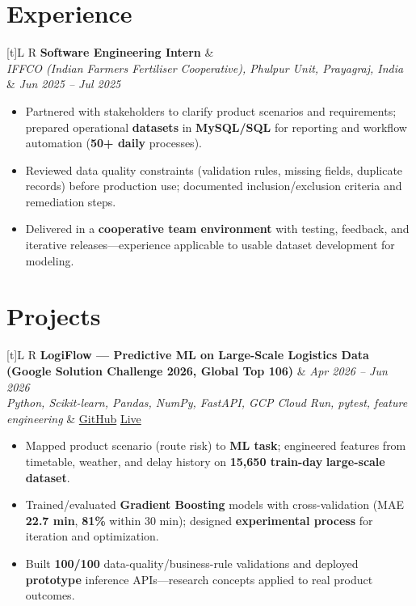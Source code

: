 \documentclass[a4paper,10pt]{article}
\newcommand{\resumeSubheading}[4]{%
  \vspace{0.5mm}
  \noindent
  \begin{tabularx}{\textwidth}[t]{L R}
    \textbf{#1} & #4 \\
    \textit{#3} & \textit{#2} \\
  \end{tabularx}
  \vspace{-0.5mm}%
}
\newcommand{\resumeProject}[4]{%
  \vspace{0.5mm}
  \noindent
  \begin{tabularx}{\textwidth}[t]{L R}
    \textbf{#1} & \textit{#3} \\
    \textit{#2} & #4 \\
  \end{tabularx}
  \vspace{-0.5mm}%
}
\begin{document}
\section{Experience}
\small
\resumeSubheading
  {Software Engineering Intern}{Jun 2025 -- Jul 2025}
  {IFFCO (Indian Farmers Fertiliser Cooperative), Phulpur Unit, Prayagraj, India}{}
\begin{itemize}
  \item Partnered with stakeholders to clarify product scenarios and requirements; prepared operational \textbf{datasets} in \textbf{MySQL/SQL} for reporting and workflow automation (\textbf{50+ daily} processes).
  \item Reviewed data quality constraints (validation rules, missing fields, duplicate records) before production use; documented inclusion/exclusion criteria and remediation steps.
  \item Delivered in a \textbf{cooperative team environment} with testing, feedback, and iterative releases---experience applicable to usable dataset development for modeling.
\end{itemize}

\section{Projects}
\small

\resumeProject
  {LogiFlow --- Predictive ML on Large-Scale Logistics Data (Google Solution Challenge 2026, Global Top 106)}
  {Python, Scikit-learn, Pandas, NumPy, FastAPI, GCP Cloud Run, pytest, feature engineering}
  {Apr 2026 -- Jun 2026}
  {\href{https://github.com/Ojas-Srivastava05/LogiFlow-Solution-Challenge-2026}{GitHub} \textbar{} \href{https://logi-flow-solution-challenge-2026.vercel.app/}{Live}}
\begin{itemize}
  \item Mapped product scenario (route risk) to \textbf{ML task}; engineered features from timetable, weather, and delay history on \textbf{15,650 train-day} \textbf{large-scale dataset}.
  \item Trained/evaluated \textbf{Gradient Boosting} models with cross-validation (MAE \textbf{22.7 min}, \textbf{81\%} within 30 min); designed \textbf{experimental process} for iteration and optimization.
  \item Built \textbf{100/100} data-quality/business-rule validations and deployed \textbf{prototype} inference APIs---research concepts applied to real product outcomes.
\end{itemize}
\end{document}
